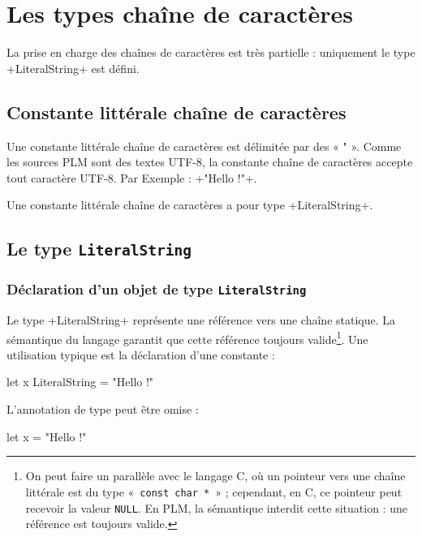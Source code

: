 




\chapter{Les types chaîne de caractères}

La prise en charge des chaînes de caractères est très partielle : uniquement le type \plm+LiteralString+ est défini.

\section{Constante littérale chaîne de caractères}

Une constante littérale chaîne de caractères est délimitée par des « " ». Comme les sources PLM sont des textes UTF-8, la constante chaîne de caractères accepte tout caractère UTF-8. Par Exemple : \plm+"Hello !"+. %

Une constante littérale chaîne de caractères a pour type \plm+LiteralString+.


\section{Le type \texttt{LiteralString}}

\subsection{Déclaration d'un objet de type \texttt{LiteralString}}

Le type \plm+LiteralString+ représente une référence vers une chaîne statique. La sémantique du langage garantit que cette référence toujours valide\footnote{On peut faire un parallèle avec le langage C, où un pointeur vers une chaîne littérale est du type «~\texttt{const char *}~» ; cependant, en C, ce pointeur peut recevoir la valeur \texttt{NULL}. En PLM, la sémantique interdit cette situation : une référence est toujours valide.}. Une utilisation typique est la déclaration d'une constante :
\begin{PLM}
let x LiteralString = "Hello !"
\end{PLM}

L'annotation de type peut être omise :
\begin{PLM}
let x = "Hello !"
\end{PLM}

